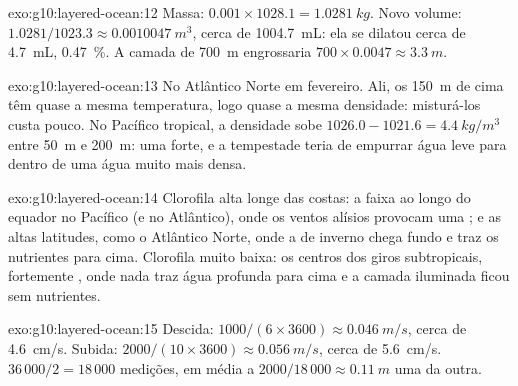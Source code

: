 \begin{solution}{exo:g10:layered-ocean:12}
Massa: $0.001 \times 1028.1 = \qty{1.0281}{kg}$. Novo volume: $1.0281/1023.3
\approx \qty{0.0010047}{m^3}$, cerca de \qty{1004.7}{mL}: ela se dilatou
cerca de \qty{4.7}{mL}, \qty{0.47}{\percent}. A camada de \qty{700}{m}
engrossaria $700 \times 0.0047 \approx \qty{3.3}{m}$.
\end{solution}

\begin{solution}{exo:g10:layered-ocean:13}
No Atlântico Norte em fevereiro. Ali, os \qty{150}{m} de cima têm quase a
mesma temperatura, logo quase a mesma densidade: misturá-los custa pouco.
No Pacífico tropical, a densidade sobe $1026.0 - 1021.6 =
\qty{4.4}{kg/m^3}$ entre \qty{50}{m} e \qty{200}{m}: uma  forte, e
a tempestade teria de empurrar água leve para dentro de uma água muito mais
densa.
\end{solution}

\begin{solution}{exo:g10:layered-ocean:14}
Clorofila alta longe das costas: a faixa ao longo do equador no Pacífico (e
no Atlântico), onde os ventos alísios provocam uma ; e as altas
latitudes, como o Atlântico Norte, onde a  de inverno
chega fundo e traz os nutrientes para cima. Clorofila muito baixa: os
centros dos giros subtropicais, fortemente , onde nada traz
água profunda para cima e a camada iluminada ficou sem nutrientes.
\end{solution}

\begin{solution}{exo:g10:layered-ocean:15}
Descida: $1000/(6 \times 3600) \approx \qty{0.046}{m/s}$, cerca de
\qty{4.6}{cm/s}. Subida: $2000/(10 \times 3600) \approx \qty{0.056}{m/s}$,
cerca de \qty{5.6}{cm/s}. $36\,000/2 = 18\,000$ medições, em média a
$2000/18\,000 \approx \qty{0.11}{m}$ uma da outra.
\end{solution}

